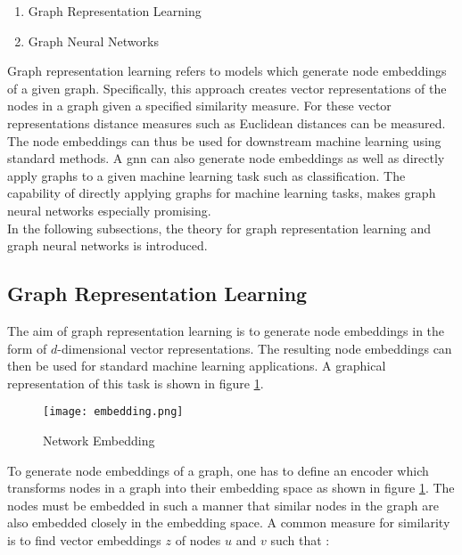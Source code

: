 	\begin{enumerate}
		\item Graph Representation Learning
		\item Graph Neural Networks
	\end{enumerate}
	
	\noindent Graph representation learning refers to models which generate node
	embeddings of a given graph. Specifically, this approach creates vector 
	representations of the nodes in a graph given a specified similarity measure. 
	For these vector representations distance measures such as Euclidean 
	distances can be measured. The node embeddings can thus be used for
	downstream machine learning using standard methods. A \ac{gnn} 
	can also generate node embeddings as well as directly apply graphs to a 
	given machine learning task such as classification. The capability of
	directly applying graphs for machine learning tasks, makes graph neural 
	networks especially promising. \\

	\noindent In the following subsections, the theory for graph representation 
	learning and graph neural networks is introduced. 

	\subsection{Graph Representation Learning}

	The aim of graph representation learning is to generate node embeddings in 
	the form of $d$-dimensional vector representations. The resulting node 
	embeddings can then be used for standard machine learning applications. 
	A graphical representation of this task is shown in figure 
	\ref{fig:embedding}.

	\begin{figure}[h]
		\centering
		\texttt{[image: embedding.png]}
		\caption{Network Embedding}
		\cite{leskovec2021lecture}
		\label{fig:embedding}
	\end{figure}

	\noindent To generate node embeddings of a graph, one has to define an
	encoder which transforms nodes in a graph into their embedding space as
	shown in figure \ref{fig:embedding}. The nodes must be embedded in such a
	manner that similar nodes in the graph are also embedded closely in the 
	embedding space. A common measure for similarity is to find vector embeddings 
	$z$ of nodes $u$ and $v$ such that \citep{leskovec2021lecture}:


